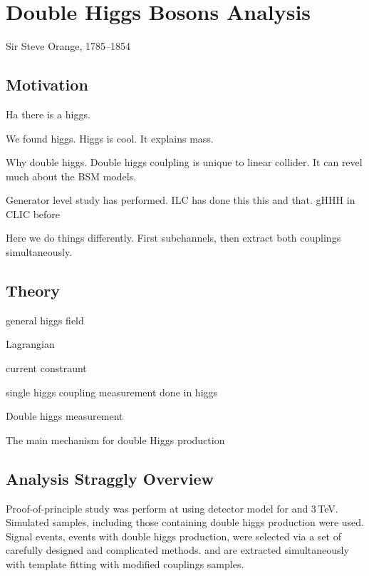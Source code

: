 \chapter{Double Higgs Bosons Analysis}
\label{chap:DoubleHiggs}

%
{Sir Steve Orange, 1785--1854}%

\section{Motivation}

Ha there is a higgs.

We found higgs. Higgs is cool. It explains mass.

Why double higgs. Double higgs coulpling is unique to linear collider. It can revel much about the BSM models.

Generator level study has performed. ILC has done this this and that. gHHH in CLIC before

Here we do things differently. First subchannels, then extract both couplings simultaneously.

\section{Theory}

general higgs field

Lagrangian

current constraunt

single higgs coupling measurement done in higgs

Double higgs measurement

The main mechanism for double Higgs production %

\section{Analysis Straggly Overview}

Proof-of-principle study was perform at \CLIC using \CLICILD detector model for  and 3\,TeV. Simulated samples, including those containing double higgs production were used. Signal events, events with double higgs production, were selected via a set of carefully designed and complicated methods. \gHHH and \gWWHH are extracted simultaneously with template fitting with modified couplings samples.
